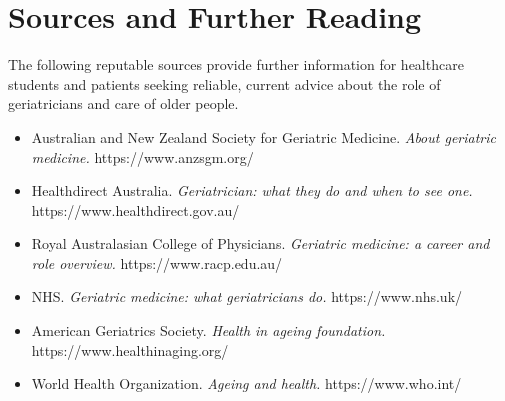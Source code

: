 \section*{Sources and Further Reading}
The following reputable sources provide further information for healthcare students and patients seeking reliable, current advice about the role of geriatricians and care of older people.

\begin{itemize}
    \item Australian and New Zealand Society for Geriatric Medicine. \textit{About geriatric medicine.} https://www.anzsgm.org/
    \item Healthdirect Australia. \textit{Geriatrician: what they do and when to see one.} https://www.healthdirect.gov.au/
    \item Royal Australasian College of Physicians. \textit{Geriatric medicine: a career and role overview.} https://www.racp.edu.au/
    \item NHS. \textit{Geriatric medicine: what geriatricians do.} https://www.nhs.uk/
    \item American Geriatrics Society. \textit{Health in ageing foundation.} https://www.healthinaging.org/
    \item World Health Organization. \textit{Ageing and health.} https://www.who.int/
\end{itemize}
